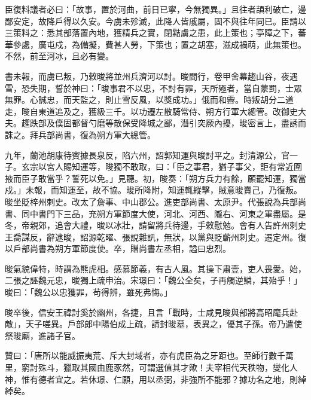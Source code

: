 \begin{pinyinscope}
 臣復料議者必曰：「故事，置於河曲，前日已寧，今無獨異。」且往者頡利破亡，邊鄙安定，故降戶得以久安。今虜未殄滅，此降人皆戚屬，固不與往年同已。臣請以三策料之：悉其部落置內地，獲精兵之實，閉黠虜之患，此上策也；亭障之下，蕃華參處，廣屯戍，為備擬，費甚人勞，下策也；置之胡塞，滋成禍萌，此無策也。不然，前至河冰，且必有變。



 書未報，而虜已叛，乃敕晙將並州兵濟河以討。晙間行，卷甲舍幕趨山谷，夜遇雪，恐失期，誓於神曰：「晙事君不以忠，不討有罪，天所殛者，當自蒙罰，士眾無罪。心誠忠，而天監之，則止雪反風，以獎成功。」俄而和霽。時叛胡分二道走，晙自東道追及之，獲級三千。以功遷左散騎常侍、朔方行軍大總管。改御史大夫。趯跌部及僕固都督勺磨等散保受降城之鄙，潛引突厥內擾，晙密言上，盡誘而誅之。拜兵部尚書，復為朔方軍大總管。



 九年，蘭池胡康待賓據長泉反，陷六州，詔郭知運與晙討平之。封清源公，官一子。玄宗以宮人賜知運等，晙獨不敢取，曰：「臣之事君，猶子事父，詎有常近圍掖而臣子敢當乎？誓死以免。」見聽。初，晙奏：「朔方兵力有餘，願罷知運，獨當戍。」未報，而知運至，故不協。晙所降附，知運輒縱擊，賊意晙賣己，乃復叛。晙坐貶梓州刺史。改太了詹事、中山郡公。進吏部尚書、太原尹。代張說為兵部尚書、同中書門下三品，充朔方軍節度大使，河北、河西、隴右、河東之軍盡屬。是冬，帝親郊，追會大禮，晙以冰壯，請留將兵待邊，手敕慰勉。會有人告許州刺史王喬謀反，辭逮晙，詔源乾曜、張說雜訊，無狀，以黨與貶蘄州刺史。遷定州。復以戶部尚書為朔方軍節度使。卒，贈尚書左丞相，謚曰忠烈。



 晙氣貌偉特，時謂為熊虎相。感慕節義，有古人風。其操下肅壹，吏人畏愛。始，二張之誣魏元忠，晙獨上疏申治。宋璟曰：「魏公全矣，子再觸逆鱗，其殆乎！」晙曰：「魏公以忠獲罪，茍得辨，雖死弗悔。」



 晙卒後，信安王禕討奚於幽州，各捷，且言「戰時，士咸見晙與部將高昭麾兵赴敵」，天子嗟異。戶部郎中陽伯成上疏，請封晙墓，表異之，優其子孫。帝乃遣使祭晙廟，進諸子官。



 贊曰：「唐所以能威振夷荒、斥大封域者，亦有虎臣為之牙距也。至師行數千萬里，窮討殊斗，獵取其國由鹿豕然，可謂選值其才歟！夫宰相代天秩物，燮化人神，惟有德者宜之。若休璟、仁願，用以丞弼，非強所不能邪？據功名之地，則綽綽矣。



\end{pinyinscope}